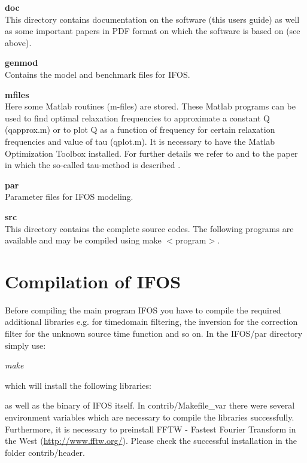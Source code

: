 \textbf{doc}\\
This directory contains documentation on the software (this users guide) as well as some important papers in PDF format on which the software is based on (see above).

\textbf{genmod}\\
Contains the model and benchmark files for IFOS.

\textbf{mfiles}\\
Here some Matlab routines (m-files) are stored. These Matlab programs can be used to find optimal relaxation frequencies to approximate a constant Q (qapprox.m) or to plot Q as a function of frequency for certain relaxation frequencies and value of tau (qplot.m). It is necessary to have the Matlab Optimization Toolbox installed. For further details we refer to \cite{bohlen:98} and to the paper in which the so-called tau-method is described \cite{blanch:95}.

\textbf{par}\\
Parameter files for IFOS modeling.


\textbf{src}\\
This directory contains the complete source codes.  The following programs are available and may be compiled using make $<$program$>$.


\section{Compilation of IFOS}\label{compexec}
Before compiling the main program IFOS you have to compile the required additional libraries e.g. for timedomain filtering, the inversion for the correction filter for the unknown source time function and so on. In the IFOS/par directory simply use:
\newline

\textit{make}
\newline

which will install the following libraries:

{\color{blue}{\begin{verbatim}
lib cseife
lib stfinv
lib aff
lib fourier
\end{verbatim}}}
as well as the binary of IFOS itself.
In contrib/Makefile\_var there were several environment variables which are necessary to compile the libraries successfully. Furthermore, it is necessary to preinstall FFTW - Fastest Fourier Transform in the West (\href{http://www.fftw.org/}{http://www.fftw.org/}). Please check the successful installation in the folder contrib/header.
\newline
  
